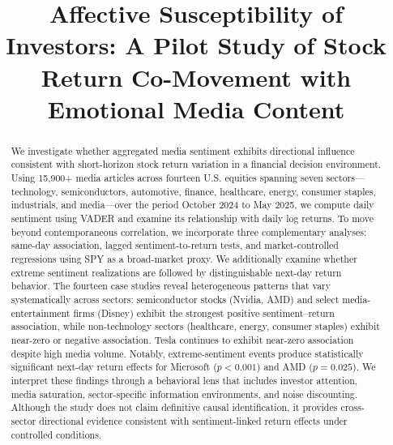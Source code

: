 \documentclass[lettersize,journal]{IEEEtran}
\begin{document}
\title{Affective Susceptibility of Investors: A Pilot Study of Stock Return Co-Movement with Emotional Media Content}

\author{%
}

\maketitle

\begin{abstract}
We investigate whether aggregated media sentiment exhibits directional influence consistent with short-horizon stock return variation in a financial decision environment. Using 15{,}900+ media articles across fourteen U.S. equities spanning seven sectors---technology, semiconductors, automotive, finance, healthcare, energy, consumer staples, industrials, and media---over the period October 2024 to May 2025, we compute daily sentiment using VADER and examine its relationship with daily log returns. To move beyond contemporaneous correlation, we incorporate three complementary analyses: same-day association, lagged sentiment-to-return tests, and market-controlled regressions using SPY as a broad-market proxy. We additionally examine whether extreme sentiment realizations are followed by distinguishable next-day return behavior. The fourteen case studies reveal heterogeneous patterns that vary systematically across sectors: semiconductor stocks (Nvidia, AMD) and select media-entertainment firms (Disney) exhibit the strongest positive sentiment--return association, while non-technology sectors (healthcare, energy, consumer staples) exhibit near-zero or negative association. Tesla continues to exhibit near-zero association despite high media volume. Notably, extreme-sentiment events produce statistically significant next-day return effects for Microsoft ($p < 0.001$) and AMD ($p = 0.025$). We interpret these findings through a behavioral lens that includes investor attention, media saturation, sector-specific information environments, and noise discounting. Although the study does not claim definitive causal identification, it provides cross-sector directional evidence consistent with sentiment-linked return effects under controlled conditions.
\end{abstract}
\end{document}
